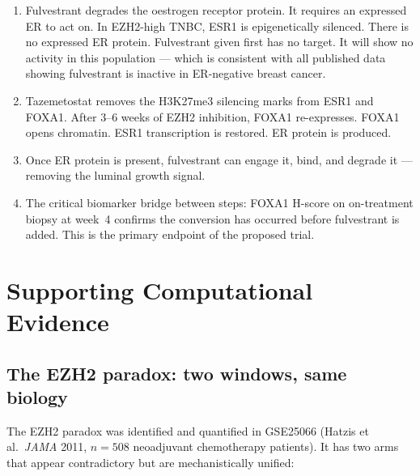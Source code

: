 \documentclass[12pt, a4paper]{article}
\begin{document}
\begin{enumerate}
  \item Fulvestrant degrades the oestrogen receptor
        protein. It requires an expressed ER to act on.
        In EZH2-high TNBC, ESR1 is epigenetically
        silenced. There is no expressed ER protein.
        Fulvestrant given first has no target.
        It will show no activity in this population ---
        which is consistent with all published data
        showing fulvestrant is inactive in ER-negative
        breast cancer.

  \item Tazemetostat removes the H3K27me3 silencing
        marks from ESR1 and FOXA1. After 3--6 weeks
        of EZH2 inhibition, FOXA1 re-expresses.
        FOXA1 opens chromatin. ESR1 transcription
        is restored. ER protein is produced.

  \item Once ER protein is present, fulvestrant can
        engage it, bind, and degrade it --- removing
        the luminal growth signal.

  \item The critical biomarker bridge between steps:
        FOXA1 H-score on on-treatment biopsy at week~4
        confirms the conversion has occurred before
        fulvestrant is added. This is the primary
        endpoint of the proposed trial.
\end{enumerate}

\section{Supporting Computational Evidence}
\label{sec:ezh2paradox}

\subsection{The EZH2 paradox: two windows, same biology}

The EZH2 paradox was identified and quantified in
GSE25066 (Hatzis et al.\ \textit{JAMA} 2011, $n=508$
neoadjuvant chemotherapy patients). It has two arms
that appear contradictory but are mechanistically unified:
\end{document}
